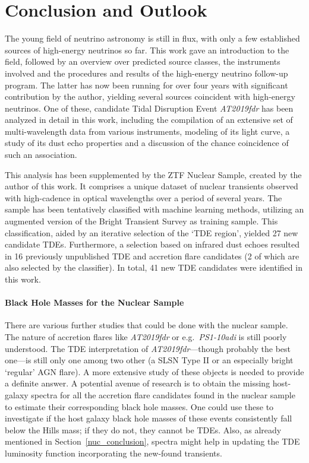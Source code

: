 \chapter*{Conclusion and Outlook}\label{conclusion}
The young field of neutrino astronomy is still in flux, with only a few established sources of high-energy neutrinos so far. This work gave an introduction to the field, followed by an overview over predicted source classes, the instruments involved and the procedures and results of the high-energy neutrino follow-up program. The latter has now been running for over four years with significant contribution by the author, yielding several sources coincident with high-energy neutrinos. One of these, candidate Tidal Disruption Event \textit{AT2019fdr} has been analyzed in detail in this work, including the compilation of an extensive set of multi-wavelength data from various instruments, modeling of its light curve, a study of its dust echo properties and a discussion of the chance coincidence of such an association.

This analysis has been supplemented by the ZTF Nuclear Sample, created by the author of this work. It comprises a unique dataset of nuclear transients observed with high-cadence in optical wavelengths over a period of several years. The sample has been tentatively classified with machine learning methods, utilizing an augmented version of the Bright Transient Survey as training sample. This classification, aided by an iterative selection of the `TDE region', yielded 27 new candidate TDEs. Furthermore, a selection based on infrared dust echoes resulted in 16 previously unpublished TDE and accretion flare candidates (2 of which are also selected by the classifier). In total, 41 new TDE candidates were identified in this work.

\subsubsection{Black Hole Masses for the Nuclear Sample}
There are various further studies that could be done with the nuclear sample. The nature of accretion flares like \textit{AT2019fdr} or e.g.~\textit{PS1-10adi} is still poorly understood. The TDE interpretation of \textit{AT2019fdr}---though probably the best one---is still only one among two other (a SLSN Type II or an especially bright `regular' AGN flare). A more extensive study of these objects is needed to provide a definite answer. A potential avenue of research is to obtain the missing host-galaxy spectra for all the accretion flare candidates found in the nuclear sample to estimate their corresponding black hole masses. One could use these to investigate if the host galaxy black hole masses of these events consistently fall below the Hills mass; if they do not, they cannot be TDEs. Also, as already mentioned in Section~\ref{nuc_conclusion}, spectra might help in updating the TDE luminosity function incorporating the new-found transients.

